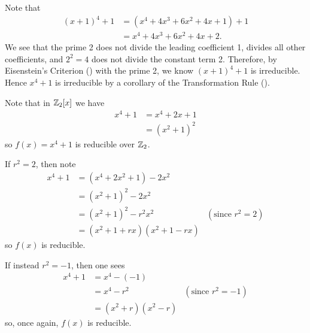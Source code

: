 \begin{questions}
    \item \begin{partquestions}{\alph*}
        \item Note that
        \begin{align*}
            (x+1)^4 + 1 &= (x^4 + 4x^3 + 6x^2 + 4x + 1) + 1\\
            &= x^4 + 4x^3 + 6x^2 + 4x + 2.
        \end{align*}
        We see that the prime 2 does not divide the leading coefficient 1, divides all other coefficients, and $2^2 = 4$ does not divide the constant term 2. Therefore, by Eisenstein's Criterion () with the prime 2, we know $(x+1)^4 + 1$ is irreducible. Hence $x^4 + 1$ is irreducible by a corollary of the Transformation Rule ().

        \item Note that in $\mathbb{Z}_2[x]$ we have
        \begin{align*}
            x^4 + 1 &= x^4 + 2x + 1\\
            &= (x^2+1)^2
        \end{align*}
        so $f(x) = x^4+1$ is reducible over $\mathbb{Z}_2$.

        \begin{partquestions}{\roman*}
            \item \begin{partquestions}{\alph*}
                \item If $r^2 = 2$, then note
                \begin{align*}
                    x^4 + 1 &= (x^4 + 2x^2 +1) - 2x^2\\
                    &= (x^2+1)^2 - 2x^2\\
                    &= (x^2+1)^2 - r^2x^2 & (\text{since } r^2 = 2)\\
                    &= (x^2+1+rx)(x^2+1-rx)
                \end{align*}
                so $f(x)$ is reducible.

                \item If instead $r^2 = -1$, then one sees
                \begin{align*}
                    x^4 + 1 &= x^4 - (-1)\\
                    &= x^4 - r^2 & (\text{since } r^2 = -1)\\
                    &= (x^2+r)(x^2-r)
                \end{align*}
                so, once again, $f(x)$ is reducible.


\end{partquestions}
\end{partquestions}
\end{partquestions}
\end{questions}
